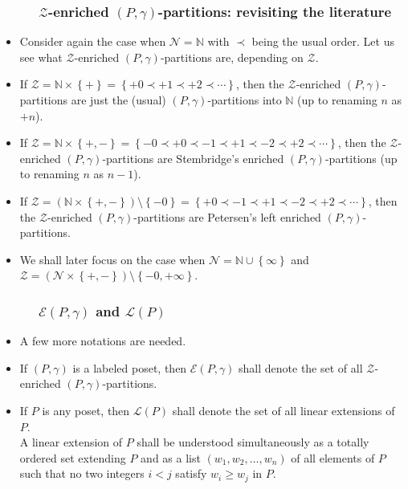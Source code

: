 \documentclass{beamer}
\newcommand{\NN}{{\mathbb N}}
\newcommand{\calE}{\mathcal{E}}
\newcommand{\calL}{\mathcal{L}}
\newcommand{\calN}{\mathcal{N}}
\newcommand{\calZ}{\mathcal{Z}}
\newcommand{\fti}[1]{\frametitle{\ \ \ \ \ #1}}
\newcommand{\set}[1]{\left\{ #1 \right\}}
\newcommand{\tup}[1]{\left( #1 \right)}
\newcommand{\defn}[1]{{\color{darkred}\emph{#1}}} %
\theoremstyle{plain}
\begin{document}
\begin{frame}
\fti{$\calZ$-enriched $\tup{P,\gamma}$-partitions: revisiting the literature}

\begin{itemize}

\item Consider again the case when $\calN = \NN$ with $\prec$ being the usual order.
Let us see what $\calZ$-enriched $\tup{P,\gamma}$-partitions are,
depending on $\calZ$.

\pause

\item If $\calZ = \NN \times \set{+} = \set{+0 \prec +1 \prec +2 \prec \cdots}$,
then the $\calZ$-enriched $\tup{P,\gamma}$-partitions are just
the (usual) $\tup{P,\gamma}$-partitions into $\NN$ (up to renaming
$n$ as $+n$).

\pause
\item If $\calZ = \NN \times \set{+,-}
= \set{-0 \prec +0 \prec -1 \prec +1 \prec -2 \prec +2 \prec \cdots}$, then the
$\calZ$-enriched $\tup{P,\gamma}$-partitions are
Stembridge's enriched $\tup{P,\gamma}$-partitions (up to renaming
$n$ as $n-1$).

\pause
\item If $\calZ = \tup{\NN \times \set{+,-}} \setminus \set{-0}
= \set{+0 \prec -1 \prec +1 \prec -2 \prec +2 \prec \cdots}$, then the
$\calZ$-enriched $\tup{P,\gamma}$-partitions are
Petersen's left enriched $\tup{P,\gamma}$-partitions.

\pause

\item We shall later focus on the case when
$\calN = \NN \cup \set{\infty}$ and
$\calZ = \tup{\calN \times \set{+,-}} \setminus \set{-0, +\infty}$.

\end{itemize}

\end{frame}

\begin{frame}
\fti{$\calE\tup{P,\gamma}$ and $\calL\tup{P}$}

\begin{itemize}

\item A few more notations are needed.

\item If $\left(  P,\gamma\right)  $ is a labeled poset, then
\defn{$\calE\tup{P,\gamma}$}
shall denote the set of all $\mathcal{Z}$-enriched $\left(
P,\gamma\right)  $-partitions.

\pause

\item If $P$ is any poset, then \defn{$\calL\tup{P}$} shall denote the set
of all linear extensions of $P$. \\
A linear extension of $P$ shall be understood
simultaneously as a totally ordered set extending $P$ and as a list $\left(
w_{1},w_{2},\ldots,w_{n}\right)  $ of all elements of $P$ such that no two
integers $i<j$ satisfy $w_{i}\geq w_{j}$ in $P$.

\end{itemize}

\end{frame}
\end{document}
